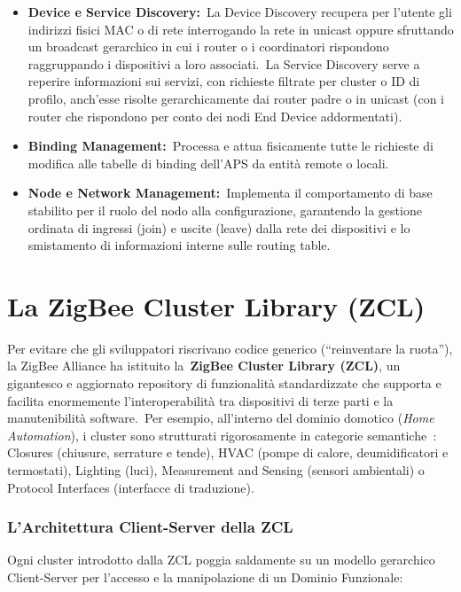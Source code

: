 \documentclass[
  italian,
  openany]{book}
\begin{document}
\begin{itemize}
\item
  \textbf{Device e Service Discovery:}~La Device Discovery recupera per
  l'utente gli indirizzi fisici MAC o di rete interrogando la rete in
  unicast oppure sfruttando un broadcast gerarchico in cui i router o i
  coordinatori rispondono raggruppando i dispositivi a loro
  associati.~La Service Discovery serve a reperire informazioni sui
  servizi, con richieste filtrate per cluster o ID di profilo, anch'esse
  risolte gerarchicamente dai router padre o in unicast (con i router
  che rispondono per conto dei nodi End Device addormentati).
\item
  \textbf{Binding Management:}~Processa e attua fisicamente tutte le
  richieste di modifica alle tabelle di binding dell'APS da entità
  remote o locali.
\item
  \textbf{Node e Network Management:}~Implementa il comportamento di
  base stabilito per il ruolo del nodo alla configurazione, garantendo
  la gestione ordinata di ingressi (join) e uscite (leave) dalla rete
  dei dispositivi e lo smistamento di informazioni interne sulle routing
  table.
\end{itemize}

\section{La ZigBee Cluster Library
(ZCL)}\label{la-zigbee-cluster-library-zcl}

Per evitare che gli sviluppatori riscrivano codice generico
(``reinventare la ruota''), la ZigBee Alliance ha istituito
la~\textbf{ZigBee Cluster Library (ZCL)}, un gigantesco e aggiornato
repository di funzionalità standardizzate che supporta e facilita
enormemente l'interoperabilità tra dispositivi di terze parti e la
manutenibilità software.~Per esempio, all'interno del dominio domotico
(\emph{Home Automation}), i cluster sono strutturati rigorosamente in
categorie semantiche~: Closures (chiusure, serrature e tende), HVAC
(pompe di calore, deumidificatori e termostati), Lighting (luci),
Measurement and Sensing (sensori ambientali) o Protocol Interfaces
(interfacce di traduzione).

\subsubsection{L'Architettura Client-Server della
ZCL}\label{larchitettura-client-server-della-zcl}

Ogni cluster introdotto dalla ZCL poggia saldamente su un modello
gerarchico Client-Server per l'accesso e la manipolazione di un Dominio
Funzionale:
\end{document}
